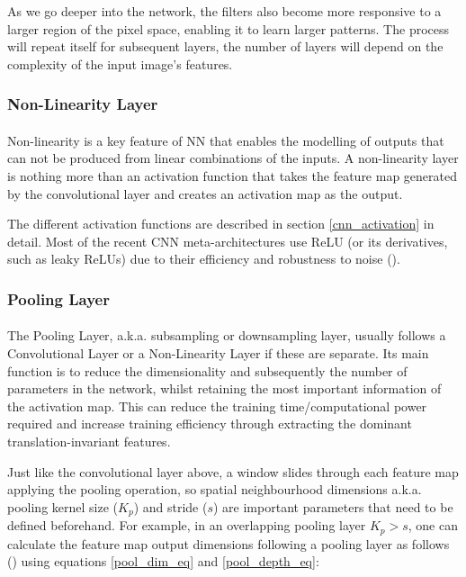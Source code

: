 As we go deeper into the network, the filters also become more responsive to a larger region of the pixel space, enabling it to learn larger patterns. The process will repeat itself for subsequent layers, the number of layers will depend on the complexity of the input image's features.

\subsubsection{Non-Linearity Layer}
\paragraph{}
Non-linearity is a key feature of \gls{NN} that enables the modelling of outputs that can not be produced from linear combinations of the inputs. A non-linearity layer is nothing more than an activation function that takes the feature map generated by the convolutional layer and creates an activation map as the output. 

The different activation functions are described in section \ref{cnn_activation} in detail. Most of the recent \gls{CNN} meta-architectures use \gls{ReLU} (or its derivatives, such as leaky \gls{ReLU}s) due to their efficiency and robustness to noise (\cite{He_2015_ICCV}).

\subsubsection{Pooling Layer}
\paragraph{}
The Pooling Layer, \gls{a.k.a.} subsampling or downsampling layer, usually follows a Convolutional Layer or a Non-Linearity Layer if these are separate. 
Its main function is to reduce the dimensionality and subsequently the number of parameters in the network, whilst retaining the most important information of the activation map. This can reduce the training time/computational power required and increase training efficiency through extracting the dominant translation-invariant features.

Just like the convolutional layer above, a window slides through each feature map applying the pooling operation, so spatial neighbourhood dimensions \gls{a.k.a.} pooling kernel size ($K_p$) and stride ($s$) are important parameters that need to be defined beforehand. For example, in an overlapping pooling layer $K_p > s$, one can calculate the feature map output dimensions following a pooling layer as follows (\cite{dumoulin2018guide}) using equations \ref{pool_dim_eq} and \ref{pool_depth_eq}:

